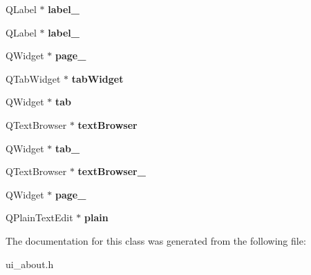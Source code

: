 \begin{DoxyCompactItemize}
\item 
\hypertarget{classUi__about_aef1b6ef4e3a01966c0e1036b3aa7f23f}{
QLabel $\ast$ {\bfseries label\_}}
\label{classUi__about_aef1b6ef4e3a01966c0e1036b3aa7f23f}

\item 
\hypertarget{classUi__about_aa459ebfad1e0a2648d20c60d4c6fc115}{
QLabel $\ast$ {\bfseries label\_}}
\label{classUi__about_aa459ebfad1e0a2648d20c60d4c6fc115}

\item 
\hypertarget{classUi__about_ae8fa17161b240480e903aea6b9ada290}{
QWidget $\ast$ {\bfseries page\_}}
\label{classUi__about_ae8fa17161b240480e903aea6b9ada290}

\item 
\hypertarget{classUi__about_a3d168e9475d87a9889fa7cb50a9de5a8}{
QTabWidget $\ast$ {\bfseries tabWidget}}
\label{classUi__about_a3d168e9475d87a9889fa7cb50a9de5a8}

\item 
\hypertarget{classUi__about_a1849ee3563ac7a6e33685e5a8e3ef77a}{
QWidget $\ast$ {\bfseries tab}}
\label{classUi__about_a1849ee3563ac7a6e33685e5a8e3ef77a}

\item 
\hypertarget{classUi__about_a9af2caf77c8d2dd709c0e7a893d8ae60}{
QTextBrowser $\ast$ {\bfseries textBrowser}}
\label{classUi__about_a9af2caf77c8d2dd709c0e7a893d8ae60}

\item 
\hypertarget{classUi__about_adb6da8ff2f93532372eef3704898e677}{
QWidget $\ast$ {\bfseries tab\_}}
\label{classUi__about_adb6da8ff2f93532372eef3704898e677}

\item 
\hypertarget{classUi__about_a5105430ce15bd81a1a93d192f3ff0428}{
QTextBrowser $\ast$ {\bfseries textBrowser\_}}
\label{classUi__about_a5105430ce15bd81a1a93d192f3ff0428}

\item 
\hypertarget{classUi__about_ab53caedb09cc7a40a6ebd02032006b81}{
QWidget $\ast$ {\bfseries page\_}}
\label{classUi__about_ab53caedb09cc7a40a6ebd02032006b81}

\item 
\hypertarget{classUi__about_a0469ccb1dc32f0b8e757e59148ae3467}{
QPlainTextEdit $\ast$ {\bfseries plain}}
\label{classUi__about_a0469ccb1dc32f0b8e757e59148ae3467}

\end{DoxyCompactItemize}


The documentation for this class was generated from the following file:\begin{DoxyCompactItemize}
\item 
ui\_\-about.h\end{DoxyCompactItemize}
